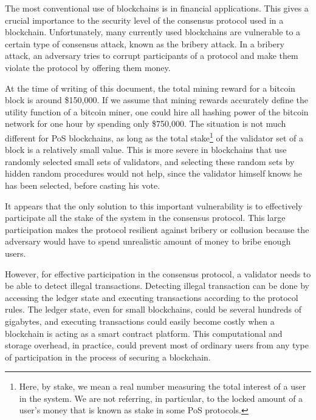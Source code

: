 The most conventional use of blockchains is in financial applications. This gives a crucial importance to the
security level of the consensus protocol used in a blockchain. Unfortunately, many currently used blockchains are
vulnerable to a
certain type of consensus attack, known as the bribery attack. In a bribery attack, an adversary tries to corrupt
participants of a protocol and make them violate the protocol by offering them money.

At the time of writing of this document,
the total mining reward for a bitcoin block is around \$150,000. If we assume that mining rewards accurately define
the utility function of a bitcoin miner, one could hire all hashing power of the bitcoin network for one hour by
spending
only \$750,000. The situation is not much different for PoS blockchains, as long as the total stake\footnote{Here, by
stake, we mean a real number measuring the total interest of a user in the system. We are not referring, in
particular, to the locked amount of a user's money that is known as stake in some PoS protocols.}
of the validator set of a block is a relatively small value. This is more severe in blockchains that use
randomly selected small sets of validators, and selecting these random sets by hidden random procedures would not
help, since the validator himself knows he has been selected, before casting his vote.

It appears that the only solution to this important vulnerability is to effectively participate all the stake of the
system in the consensus protocol. This large participation makes the protocol resilient against bribery or
collusion because the adversary would have to spend unrealistic amount of money to bribe enough users.

However, for effective participation in the consensus protocol, a validator needs to be able to detect
illegal transactions. Detecting illegal transaction can be done by accessing the ledger
state and executing transactions according to the protocol rules. The
ledger state, even for small blockchains, could be several
hundreds of gigabytes, and executing transactions could easily become costly when a blockchain is acting as a
smart contract platform. This computational and storage overhead, in practice, could prevent most of
ordinary users from any type of participation in the process of securing a blockchain.

